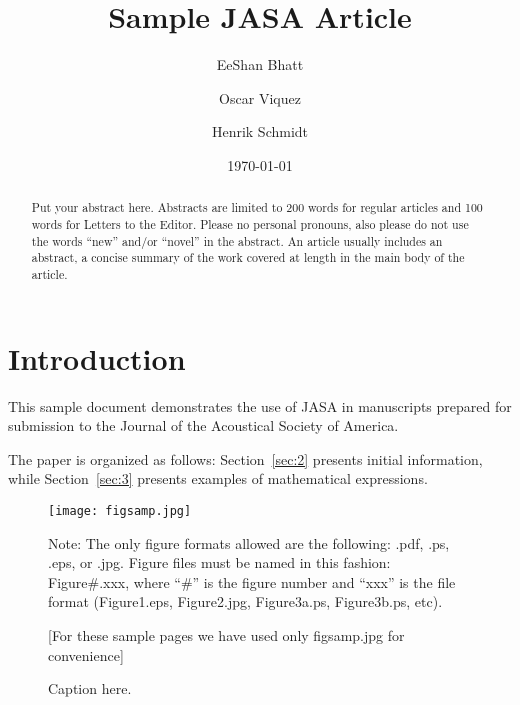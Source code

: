 \title[JASA/Sample JASA Article]{Sample JASA Article}
\author{EeShan Bhatt}
\author{Oscar Viquez}
\author{Henrik Schmidt}






\date{\today}

\begin{abstract}
Put your abstract here. Abstracts are limited to 200 words for
regular articles and 100 words for Letters to the Editor. Please no
personal pronouns, also please do not use the words ``new'' and/or
``novel'' in the abstract. An article usually includes an abstract, a
concise summary of the work covered at length in the main body of the
article.
\end{abstract}


\maketitle




\section{\label{sec:1} Introduction}
This sample document demonstrates the use of JASA in manuscripts
prepared for submission to the Journal of the Acoustical Society of America.

The paper is organized as follows: Section~\ref{sec:2} presents
initial information, while
Section~\ref{sec:3} presents examples of mathematical expressions.


\begin{figure}[ht]
\texttt{[image: figsamp.jpg]}
\caption{\label{fig:FIG1}{Caption here.}}

\raggedright
Note: The only figure formats allowed are the following:
.pdf, .ps, .eps, or .jpg. Figure files must be named in this fashion:
Figure\#.xxx, where ``\#'' is the figure number and ``xxx'' is the file format
(Figure1.eps, Figure2.jpg, Figure3a.ps, Figure3b.ps, etc).

[For these sample pages we have used only figsamp.jpg for convenience]
\end{figure}

